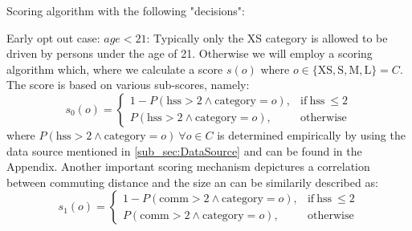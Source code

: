 Scoring algorithm with the following "decisions":

Early opt out case: $age < 21$: Typically only the XS category is allowed to be driven by persons under the age of 21.
Otherwise we will employ a scoring algorithm which, where we calculate a score $s(o)$ where 
$o \in \{ \textrm{XS}, \textrm{S}, \textrm{M}, \textrm{L} \} = C$. The score is based on various sub-scores, namely:
$$
s_0(o) = 
\begin{cases}
  1 - P(\text{hss} > 2 \land \text{category} = o), & \text{if}\ \text{hss}\ \le 2 \\
  P(\text{hss} > 2 \land \text{category} = o), & \text{otherwise}
\end{cases}
$$
where $P(\text{hss} > 2 \land \text{category} = o) \ \forall o \in C$ is determined empirically by using the data source 
mentioned in \ref{sub_sec:DataSource} and can be found in the Appendix. Another important 
scoring mechanism depictures a correlation between commuting distance and the size an can be similarily described as:
$$
s_1(o) = 
\begin{cases}
  1 - P(\text{comm} > 2 \land \text{category} = o), & \text{if}\ \text{hss}\ \le 2 \\
  P(\text{comm} > 2 \land \text{category} = o), & \text{otherwise}
\end{cases}
$$

